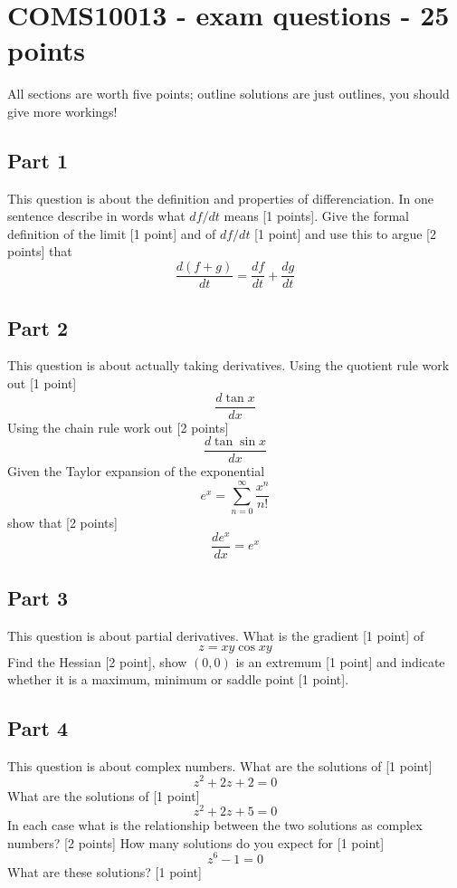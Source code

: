 \documentclass[11pt,a4paper]{scrartcl}
\begin{document}
\section*{COMS10013 - exam questions - 25 points}

All sections are worth five points; outline solutions are just outlines, you should give more workings!

\subsection*{Part 1}
This question is about the definition and properties of differenciation. In one sentence describe in words what $df/dt$ means [1 points]. Give the formal definition of the limit [1 point] and of $df/dt$ [1 point] and use this to argue [2 points] that
    $$
    \frac{d(f+g)}{dt}=\frac{df}{dt}+\frac{dg}{dt}
    $$

  
  \subsection*{Part 2}
  This question is about actually taking derivatives. Using the quotient rule work out [1 point] 
  $$
    \frac{d\tan{x}}{dx}
    $$
    Using the chain rule work out [2 points]
    $$
    \frac{d\tan{\sin{x}}}{dx}
      $$
      Given the Taylor expansion of the exponential
      $$
      e^x=\sum_{n=0}^\infty \frac{x^n}{n!}
      $$
      show that [2 points]
      $$
      \frac{de^x}{dx}=e^x
      $$

      \subsection*{Part 3}
      This question is about partial derivatives. What is the gradient [1 point] of
      $$
      z=xy\cos{xy}
      $$
      Find the Hessian [2 point], show $(0,0)$ is an extremum [1 point] and indicate whether it is a maximum, minimum or saddle point [1 point].

      \subsection*{Part 4}
      This question is about complex numbers. What are the solutions of [1 point]
      $$z^2+2z+2=0$$
      What are the solutions of [1 point]
      $$z^2+2z+5=0$$
      In each case what is the relationship between the two solutions as complex numbers? [2 points]
      How many solutions do you expect for [1 point]
      $$z^{6}-1=0$$
      What are these solutions? [1 point]
\end{document}
